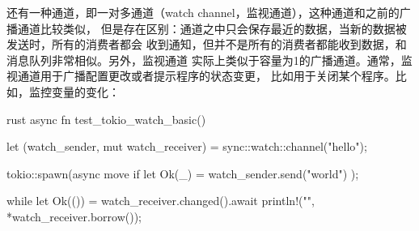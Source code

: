 还有一种通道，即一对多通道（watch channel，监视通道），这种通道和之前的广播通道比较类似，
但是存在区别：通道之中只会保存最近的数据，当新的数据被发送时，所有的消费者都会
收到通知，但并不是所有的消费者都能收到数据，和消息队列非常相似。另外，监视通道
实际上类似于容量为1的广播通道。通常，监视通道用于广播配置更改或者提示程序的状态变更，
比如用于关闭某个程序。比如，监控变量的变化：
\begin{code-block}{rust}
async fn test_tokio_watch_basic() {
    let (watch_sender, mut watch_receiver) = sync::watch::channel("hello");

    tokio::spawn(async move { if let Ok(_) = watch_sender.send("world") {} });

    while let Ok(()) = watch_receiver.changed().await {
        println!("{}", *watch_receiver.borrow());
    }
}
\end{code-block}

